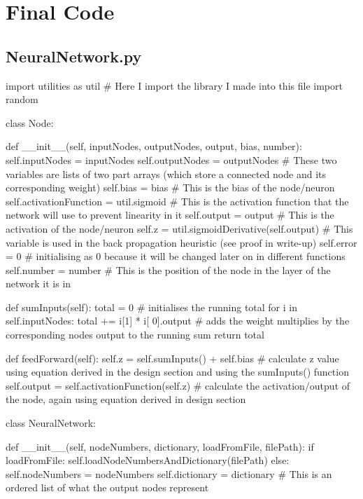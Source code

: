 \documentclass{report}
\begin{document}
\chapter{Final Code}
\section{NeuralNetwork.py}
\begin{python}
import utilities as util  # Here I import the library I made into this file
import random


class Node:

    def __init__(self, inputNodes, outputNodes, output, bias, number):
        self.inputNodes = inputNodes
        self.outputNodes = outputNodes  # These two variables are lists of two part arrays (which store a connected node and its corresponding weight)
        self.bias = bias  # This is the bias of the node/neuron
        self.activationFunction = util.sigmoid  # This is the activation function that the network will use to prevent linearity in it
        self.output = output  # This is the activation of the node/neuron
        self.z = util.sigmoidDerivative(self.output)  # This variable is used in the back propagation heuristic (see proof in write-up)
        self.error = 0  # initialising as 0 because it will be changed later on in different functions
        self.number = number  # This is the position of the node in the layer of the network it is in

    def sumInputs(self):
        total = 0  # initialises the running total
        for i in self.inputNodes:
            total += i[1] * i[
                0].output  # adds the weight multiplies by the corresponding nodes output to the running sum
        return total

    def feedForward(self):
        self.z = self.sumInputs() + self.bias  # calculate z value using equation derived in the design section and using the sumInputs() function
        self.output = self.activationFunction(self.z)  # calculate the activation/output of the node, again using equation derived in design section


class NeuralNetwork:

    def __init__(self, nodeNumbers, dictionary, loadFromFile, filePath):
        if loadFromFile:
            self.loadNodeNumbersAndDictionary(filePath)
        else:
            self.nodeNumbers = nodeNumbers
            self.dictionary = dictionary  # This is an ordered list of what the output nodes represent


\end{python}
\end{document}
